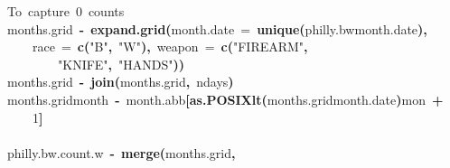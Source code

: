 \documentclass[]{beamer}
\makeatletter
\newcommand{\hlnumber}[1]{\textcolor[rgb]{0,0,0}{#1}}%
\newcommand{\hlfunctioncall}[1]{\textcolor[rgb]{.5,0,.33}{\textbf{#1}}}%
\newcommand{\hlstring}[1]{\textcolor[rgb]{.6,.6,1}{#1}}%
\newcommand{\hlkeyword}[1]{\textbf{#1}}%
\newcommand{\hlargument}[1]{\textcolor[rgb]{.69,.25,.02}{#1}}%
\newcommand{\hlcomment}[1]{\textcolor[rgb]{.18,.6,.34}{#1}}%
\newcommand{\hlassignement}[1]{\textbf{#1}}%
\newcommand{\hlsymbol}[1]{#1}%
\newcommand{\hlstd}[1]{\textcolor[rgb]{0,0,0}{#1}}%
\newenvironment{kframe}{%
 \def\FrameCommand##1{\hskip\@totalleftmargin \hskip-\fboxsep
 \colorbox{shadecolor}{##1}\hskip-\fboxsep
     \hskip-\linewidth \hskip-\@totalleftmargin \hskip\columnwidth}%
 \MakeFramed {\advance\hsize-\width
   \@totalleftmargin\z@ \linewidth\hsize
   \@setminipage}}%
 {\par\unskip\endMakeFramed}
\newenvironment{knitrout}{}{} %
\renewenvironment{knitrout}{\begin{footnotesize}}{\end{footnotesize}}
\makeatother
\begin{document}
\begin{frame}[fragile]
\begin{knitrout}
\color{fgcolor}\begin{kframe}
\begin{flushleft}
\ttfamily\noindent
\hlcomment{\usebox{\hlnormalsizeboxhash}\usebox{\hlnormalsizeboxhash}{\ }To{\ }capture{\ }0{\ }counts}\hspace*{\fill}\\
\hlstd{}\hlsymbol{months.grid}{\ }\hlassignement{\usebox{\hlnormalsizeboxlessthan}-}{\ }\hlfunctioncall{expand.grid}\hlkeyword{(}\hlargument{month.date}{\ }\hlargument{=}{\ }\hlfunctioncall{unique}\hlkeyword{(}\hlsymbol{philly.bw}\hlkeyword{\usebox{\hlnormalsizeboxdollar}}\hlsymbol{month.date}\hlkeyword{)}\hlkeyword{,}\hspace*{\fill}\\
\hlstd{}{\ }{\ }{\ }{\ }\hlargument{race}{\ }\hlargument{=}{\ }\hlfunctioncall{c}\hlkeyword{(}\hlstring{"{}B"{}}\hlkeyword{,}{\ }\hlstring{"{}W"{}}\hlkeyword{)}\hlkeyword{,}{\ }\hlargument{weapon}{\ }\hlargument{=}{\ }\hlfunctioncall{c}\hlkeyword{(}\hlstring{"{}FIREARM"{}}\hlkeyword{,}\hspace*{\fill}\\
\hlstd{}{\ }{\ }{\ }{\ }{\ }{\ }{\ }{\ }\hlstring{"{}KNIFE"{}}\hlkeyword{,}{\ }\hlstring{"{}HANDS"{}}\hlkeyword{)}\hlkeyword{)}\hspace*{\fill}\\
\hlstd{}\hlsymbol{months.grid}{\ }\hlassignement{\usebox{\hlnormalsizeboxlessthan}-}{\ }\hlfunctioncall{join}\hlkeyword{(}\hlsymbol{months.grid}\hlkeyword{,}{\ }\hlsymbol{ndays}\hlkeyword{)}\hspace*{\fill}\\
\hlstd{}\hlsymbol{months.grid}\hlkeyword{\usebox{\hlnormalsizeboxdollar}}\hlsymbol{month}{\ }\hlassignement{\usebox{\hlnormalsizeboxlessthan}-}{\ }\hlsymbol{month.abb}\hlkeyword{[}\hlfunctioncall{as.POSIXlt}\hlkeyword{(}\hlsymbol{months.grid}\hlkeyword{\usebox{\hlnormalsizeboxdollar}}\hlsymbol{month.date}\hlkeyword{)}\hlkeyword{\usebox{\hlnormalsizeboxdollar}}\hlsymbol{mon}{\ }\hlkeyword{+}\hspace*{\fill}\\
\hlstd{}{\ }{\ }{\ }{\ }\hlnumber{1}\hlkeyword{]}\hspace*{\fill}\\
\hlstd{}\hspace*{\fill}\\
\hlstd{}\hlsymbol{philly.bw.count.w}{\ }\hlassignement{\usebox{\hlnormalsizeboxlessthan}-}{\ }\hlfunctioncall{merge}\hlkeyword{(}\hlsymbol{months.grid}\hlkeyword{,}\hspace*{\fill}\\

\end{flushleft}
\end{kframe}
\end{knitrout}
\end{frame}
\end{document}

